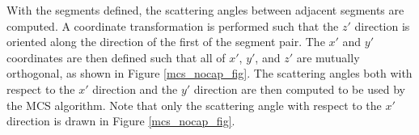 \documentclass[a4paper,11pt]{article}
\begin{document}
With the segments defined, the scattering angles between adjacent segments are computed. A coordinate transformation is performed such that the $z'$ direction is oriented along the direction of the first of the segment pair. The $x'$ and $y'$ coordinates are then defined such that all of $x'$, $y'$, and $z'$ are mutually orthogonal, as shown in Figure \ref{mcs_nocap_fig}. The scattering angles both with respect to the $x'$ direction and the $y'$ direction are then computed to be used by the MCS algorithm. Note that only the scattering angle with respect to the $x'$ direction is drawn in Figure \ref{mcs_nocap_fig}.



\end{document}
